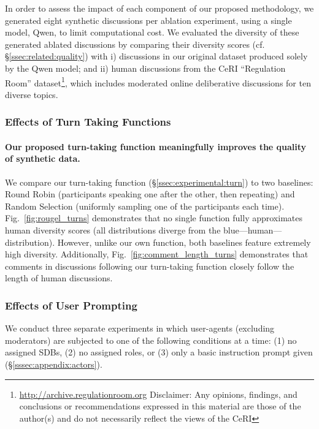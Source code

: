 In order to assess the impact of each component of our proposed methodology, we generated eight synthetic discussions per ablation experiment, using a single model, Qwen, to limit computational cost. We evaluated the diversity of these generated ablated discussions by comparing their diversity scores (cf. \S\ref{ssec:related:quality}) with i) discussions in our original dataset produced solely by the Qwen model; and ii) human discussions from the \ac{CeRI} “Regulation Room” dataset\footnote{\url{http://archive.regulationroom.org} Disclaimer: Any opinions, findings, and conclusions or recommendations expressed in this material are those of the author(s) and do not necessarily reflect the views of the \ac{CeRI}}, which includes moderated online deliberative discussions for ten diverse topics.


\subsubsection{Effects of Turn Taking Functions}

\paragraph{Our proposed turn-taking function meaningfully improves the quality of synthetic data.} We compare our turn-taking function (\S\ref{ssec:experimental:turn}) to two baselines: Round Robin (participants speaking one after the other, then repeating) and Random Selection (uniformly sampling one of the participants each time). Fig.~\ref{fig:rougel_turns} demonstrates that no single function fully approximates human diversity scores (all distributions diverge from the blue—human—distribution). However, unlike our own function, both baselines feature extremely high diversity. Additionally, Fig.~\ref{fig:comment_length_turns} demonstrates that comments in discussions following our turn-taking function closely follow the length of human discussions. %


\subsubsection{Effects of User Prompting}

We conduct three separate experiments in which user-agents (excluding moderators) are subjected to one of the following conditions at a time: (1) no assigned \acp{SDB}, (2) no assigned roles, or (3) only a basic instruction prompt given (\S\ref{sssec:appendix:actors}). 

